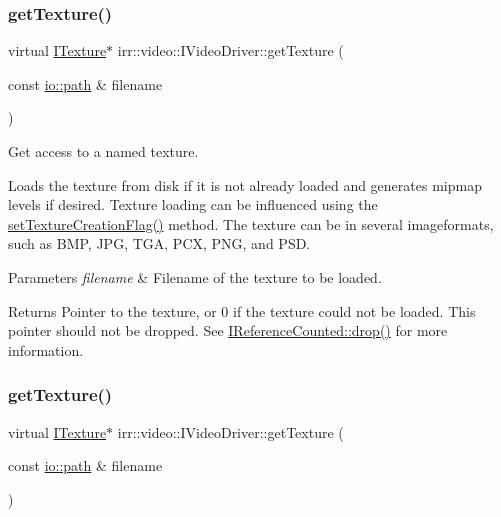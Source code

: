 \subsubsection{\texorpdfstring{get\+Texture()}{getTexture()}\hspace{0.1cm}{\footnotesize\ttfamily [1/4]}}
{\footnotesize\ttfamily virtual \hyperlink{classirr_1_1video_1_1ITexture}{I\+Texture}$\ast$ irr\+::video\+::\+I\+Video\+Driver\+::get\+Texture (\begin{DoxyParamCaption}\item[{const \hyperlink{namespaceirr_1_1io_a6468281622ce3a1c46b72e19f32dded5}{io\+::path} \&}]{filename }\end{DoxyParamCaption})\hspace{0.3cm}{\ttfamily [pure virtual]}}



Get access to a named texture. 

Loads the texture from disk if it is not already loaded and generates mipmap levels if desired. Texture loading can be influenced using the \hyperlink{classirr_1_1video_1_1IVideoDriver_a868b58a6b86b9e4841ca3879ce246c4e}{set\+Texture\+Creation\+Flag()} method. The texture can be in several imageformats, such as B\+MP, J\+PG, T\+GA, P\+CX, P\+NG, and P\+SD. 
\begin{DoxyParams}{Parameters}
{\em filename} & Filename of the texture to be loaded. \\
\hline
\end{DoxyParams}
\begin{DoxyReturn}{Returns}
Pointer to the texture, or 0 if the texture could not be loaded. This pointer should not be dropped. See \hyperlink{classirr_1_1IReferenceCounted_a03856a09355b89d178090c4a5f738543}{I\+Reference\+Counted\+::drop()} for more information. 
\end{DoxyReturn}
\mbox{\label{classirr_1_1video_1_1IVideoDriver_af4055165190e4adf221c6dc6f2434ea0}} 
\subsubsection{\texorpdfstring{get\+Texture()}{getTexture()}\hspace{0.1cm}{\footnotesize\ttfamily [2/4]}}
{\footnotesize\ttfamily virtual \hyperlink{classirr_1_1video_1_1ITexture}{I\+Texture}$\ast$ irr\+::video\+::\+I\+Video\+Driver\+::get\+Texture (\begin{DoxyParamCaption}\item[{const \hyperlink{namespaceirr_1_1io_a6468281622ce3a1c46b72e19f32dded5}{io\+::path} \&}]{filename }\end{DoxyParamCaption})\hspace{0.3cm}{\ttfamily [pure virtual]}}



